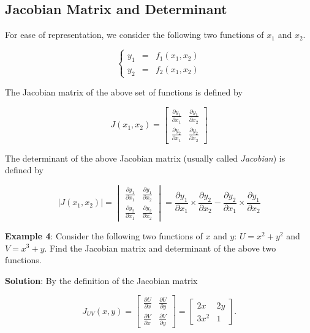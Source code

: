 \documentclass[
]{book}
\begin{document}
\hypertarget{jacobian-matrix-and-determinant}{%
\subsection{Jacobian Matrix and Determinant}\label{jacobian-matrix-and-determinant}}

For ease of representation, we consider the following two functions of \(x_1\) and \(x_2\).

\[
\left\{
\begin{array}{rrr}
   y_1 & = & f_1(x_1, x_2) \\
   y_2 & = & f_2(x_1, x_2) 
\end{array}
\right.
\]

The Jacobian matrix of the above set of functions is defined by

\[
J(x_1, x_2) = \begin{bmatrix}
\frac{\partial y_1}{\partial x_1} & \frac{\partial y_1}{\partial x_2} \\
\frac{\partial y_2}{\partial x_1} & \frac{\partial y_2}{\partial x_2}  
\end{bmatrix}
\]

The determinant of the above Jacobian matrix (usually called \emph{Jacobian}) is defined by

\[
\Big| J(x_1, x_2) \Big| = \begin{vmatrix}
\frac{\partial y_1}{\partial x_1} & \frac{\partial y_1}{\partial x_2} \\
\frac{\partial y_2}{\partial x_1} & \frac{\partial y_2}{\partial x_2}  
\end{vmatrix} = \frac{\partial y_1}{\partial x_1}\times \frac{\partial y_2}{\partial x_2} - \frac{\partial y_2}{\partial x_1} \times \frac{\partial y_1}{\partial x_2}
\]

\textbf{\color{red} Example 4}: Consider the following two functions of \(x\) and \(y\): \(U = x^2+y^2\) and \(V = x^3+y\). Find the Jacobian matrix and determinant of the above two functions.

\textbf{Solution}: By the definition of the Jacobian matrix

\[
J_{UV}(x, y) = \begin{bmatrix}
\frac{\partial U}{\partial x} & \frac{\partial U}{\partial y} \\
\frac{\partial V}{\partial x} & \frac{\partial V}{\partial y}  
\end{bmatrix} = \begin{bmatrix}
2x   & 2y \\
3x^2 & 1  
\end{bmatrix}.
\]
\end{document}
